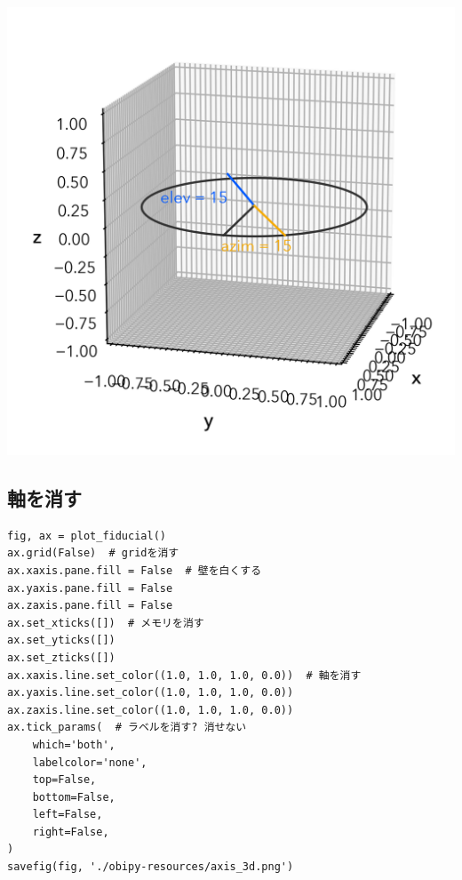 \documentclass[a4paper, 10pt, notitlepage, twocolumn, uplatex, oneside, dvipdfmx]{jsarticle}
\begin{document}
\label{}
\begin{center}
\includegraphics[width=1.0\linewidth]{./obipy-resources/view_3d.png}
\end{center}
\subsection{軸を消す}
\label{sec:orgf6c95f9}
\begin{verbatim}
fig, ax = plot_fiducial()
ax.grid(False)  # gridを消す
ax.xaxis.pane.fill = False  # 壁を白くする
ax.yaxis.pane.fill = False
ax.zaxis.pane.fill = False
ax.set_xticks([])  # メモリを消す
ax.set_yticks([])
ax.set_zticks([])
ax.xaxis.line.set_color((1.0, 1.0, 1.0, 0.0))  # 軸を消す
ax.yaxis.line.set_color((1.0, 1.0, 1.0, 0.0))
ax.zaxis.line.set_color((1.0, 1.0, 1.0, 0.0))
ax.tick_params(  # ラベルを消す? 消せない
    which='both',
    labelcolor='none',
    top=False,
    bottom=False,
    left=False,
    right=False,
)
savefig(fig, './obipy-resources/axis_3d.png')
\end{verbatim}
\end{document}
